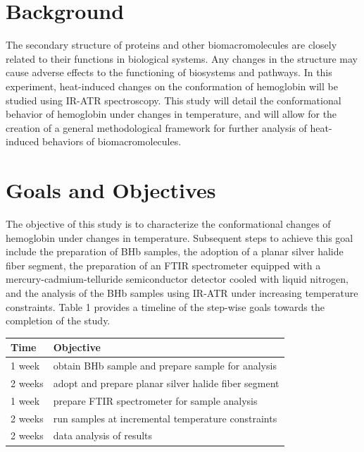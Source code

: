 \documentclass{article}
\begin{document}
\section*{Background}
The secondary structure of proteins and other biomacromolecules are closely
related to their functions in biological systems. Any changes in the structure
may cause adverse effects to the functioning of biosystems and pathways. In this
experiment, heat-induced changes on the conformation of hemoglobin will be
studied using IR-ATR spectroscopy.\cite{Harris} This study will detail the conformational
behavior of hemoglobin under changes in temperature, and will allow for the
creation of a general methodological framework for further analysis of
heat-induced behaviors of biomacromolecules.

\section*{Goals and Objectives}
The objective of this study is to characterize the conformational changes of
hemoglobin under changes in temperature. Subsequent steps to achieve this goal
include the preparation of BHb samples, the adoption of a planar silver halide
fiber segment, the preparation of an FTIR spectrometer equipped with a
mercury-cadmium-telluride semiconductor detector cooled with liquid nitrogen,
and the analysis of the BHb samples using IR-ATR under increasing temperature
constraints. Table 1 provides a timeline of the step-wise goals towards the
completion of the study.

\begin{center}
    \begin{tabular}{l|l}
        Time    & Objective \\
        \hline
        1 week  & obtain BHb sample and prepare sample for analysis \\
        2 weeks & adopt and prepare planar silver halide fiber segment \\
        1 week  & prepare FTIR spectrometer for sample analysis \\
        2 weeks & run samples at incremental temperature constraints \\
        2 weeks & data analysis of results \\
    \end{tabular}
\end{center}
\end{document}
